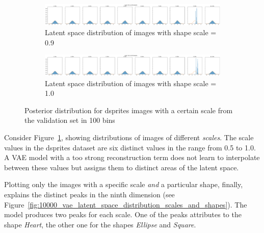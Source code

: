 \begin{figure}
\begin{subfigure}{\textwidth}
    \end{subfigure}
    \begin{subfigure}{\textwidth}
        \centering
        \includegraphics[width=\textwidth]{images/latent_space_entanglement/vae_dsprites_lf_10000_dist_scale_0_9.png}
        \caption{Latent space distribution of images with shape scale = 0.9}
    \end{subfigure}
    \begin{subfigure}{\textwidth}
        \centering
        \includegraphics[width=\textwidth]{images/latent_space_entanglement/vae_dsprites_lf_10000_dist_scale_1_0.png}
        \caption{Latent space distribution of images with shape scale = 1.0}
    \end{subfigure}
    \caption[VAE Latent Space Distribution - dsprites Scales]{Posterior distribution for dsprites images with a certain scale from the validation set in 100 bins}
    \label{fig:10000_vae_latent_space_distribution_scales}
\end{figure}

Consider Figure~\ref{fig:10000_vae_latent_space_distribution_scales}, showing distributions of images of different \textit{scales}.
The scale values in the dsprites dataset are six distinct values in the range from 0.5 to 1.0.
A \ac{VAE} model with a too strong reconstruction term does not learn to interpolate between these values but assigns them to distinct areas of the latent space.

Plotting only the images with a specific scale \textit{and} a particular shape, finally, explains the distinct peaks in the ninth dimension (see Figure~\ref{fig:10000_vae_latent_space_distribution_scales_and_shapes}).
The model produces two peaks for each scale.
One of the peaks attributes to the shape \textit{Heart}, the other one for the shapes \textit{Ellipse} and \textit{Square}.

